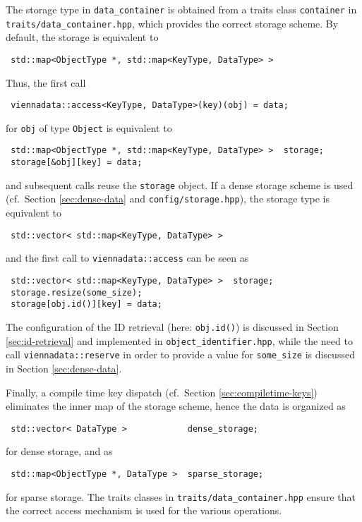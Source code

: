 The storage type in \lstinline|data_container| is obtained from a traits class \lstinline|container| in \lstinline|traits/data_container.hpp|, which provides the correct storage scheme.
By default, the storage is equivalent to
\begin{lstlisting}
 std::map<ObjectType *, std::map<KeyType, DataType> >
\end{lstlisting}
Thus, the first call
\begin{lstlisting}
 viennadata::access<KeyType, DataType>(key)(obj) = data;
\end{lstlisting}
for \lstinline|obj| of type \lstinline|Object| is equivalent to
\begin{lstlisting}
 std::map<ObjectType *, std::map<KeyType, DataType> >  storage;
 storage[&obj][key] = data;
\end{lstlisting}
and subsequent calls reuse the \lstinline|storage| object. If a dense storage scheme is used (cf.~Section \ref{sec:dense-data} and \lstinline|config/storage.hpp|), the storage type is equivalent to
\begin{lstlisting}
 std::vector< std::map<KeyType, DataType> >
\end{lstlisting}
and the first call to \lstinline|viennadata::access| can be seen as
\begin{lstlisting}
 std::vector< std::map<KeyType, DataType> >  storage;
 storage.resize(some_size);
 storage[obj.id()][key] = data;
\end{lstlisting}
The configuration of the ID retrieval (here: \lstinline|obj.id()|) is discussed in Section \ref{sec:id-retrieval} and implemented in \lstinline|object_identifier.hpp|, while the need to call \lstinline|viennadata::reserve| in order to provide a value for \lstinline|some_size| is discussed in Section \ref{sec:dense-data}.

Finally, a compile time key dispatch (cf.~Section \ref{sec:compiletime-keys}) eliminates the inner map of the storage scheme, hence the data is organized as
\begin{lstlisting}
 std::vector< DataType >            dense_storage;
\end{lstlisting}
for dense storage, and as
\begin{lstlisting}
 std::map<ObjectType *, DataType >  sparse_storage;
\end{lstlisting}
for sparse storage. The traits classes in \lstinline|traits/data_container.hpp| ensure that the correct access mechanism is used for the various operations.

